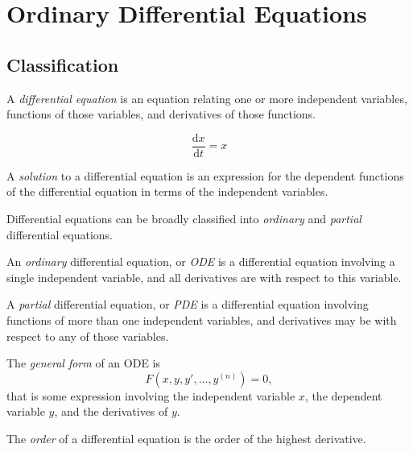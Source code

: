 \setchaptergraphic{}

\chapter{Ordinary Differential Equations}
\label{ch:diffeq}

\section{Classification}

\begin{defn}
    A \emph{differential equation} is an equation relating one or more independent variables, functions of those variables, and derivatives of those functions.
\end{defn}

\begin{exmp}\label{first-order-ode}
    \[\frac{\mathrm{d}x}{\mathrm{d}t} = x\]
\end{exmp}

\begin{defn}
    A \emph{solution} to a differential equation is an expression for the dependent functions of the differential equation in terms of the independent variables.
\end{defn}

Differential equations can be broadly classified into \emph{ordinary} and \emph{partial} differential equations.

\begin{defn}
    An \emph{ordinary} differential equation, or \emph{ODE} is a differential equation involving a single independent variable, and all derivatives are with respect to this variable.
\end{defn}

\begin{defn}
    A \emph{partial} differential equation, or \emph{PDE} is a differential equation involving functions of more than one independent variables, and derivatives may be with respect to any of those variables.
\end{defn}

\begin{defn}
    The \emph{general form} of an ODE is
    \[F(x, y, y', \ldots, y^{(n)}) = 0,\] that is some expression involving the independent variable $x$, the dependent variable $y$, and the derivatives of $y$.
\end{defn}

\begin{defn}
    The \emph{order} of a differential equation is the order of the highest derivative.
\end{defn}

